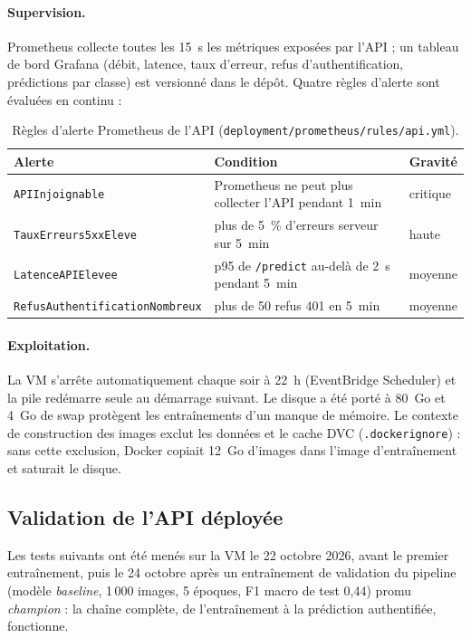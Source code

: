 \paragraph{Supervision.} Prometheus collecte toutes les 15~s les métriques exposées
par l'API ; un tableau de bord Grafana (débit, latence, taux d'erreur, refus
d'authentification, prédictions par classe) est versionné dans le dépôt. Quatre
règles d'alerte sont évaluées en continu :

\begin{table}[H]
\centering
\small
\begin{tabularx}{\linewidth}{@{}l X l@{}}
\toprule
\textbf{Alerte} & \textbf{Condition} & \textbf{Gravité} \\
\midrule
\texttt{APIInjoignable} & Prometheus ne peut plus collecter l'API pendant 1~min & critique \\
\texttt{TauxErreurs5xxEleve} & plus de 5~\% d'erreurs serveur sur 5~min & haute \\
\texttt{LatenceAPIElevee} & p95 de \texttt{/predict} au-delà de 2~s pendant 5~min & moyenne \\
\texttt{RefusAuthentificationNombreux} & plus de 50 refus 401 en 5~min & moyenne \\
\bottomrule
\end{tabularx}
\caption{Règles d'alerte Prometheus de l'API (\texttt{deployment/prometheus/rules/api.yml}).}
\label{tab:alertes-aws}
\end{table}

\paragraph{Exploitation.} La VM s'arrête automatiquement chaque soir à 22~h
(EventBridge Scheduler) et la pile redémarre seule au démarrage suivant. Le disque
a été porté à 80~Go et 4~Go de swap protègent les entraînements d'un manque de
mémoire. Le contexte de construction des images exclut les données et le cache DVC
(\texttt{.dockerignore}) : sans cette exclusion, Docker copiait 12~Go d'images dans
l'image d'entraînement et saturait le disque.

\subsection{Validation de l'API déployée}

Les tests suivants ont été menés sur la VM le 22 octobre 2026, avant le premier
entraînement, puis le 24 octobre après un entraînement de validation du pipeline
(modèle \emph{baseline}, 1\,000 images, 5 époques, F1 macro de test 0,44) promu
\emph{champion} : la chaîne complète, de l'entraînement à la prédiction authentifiée,
fonctionne.

